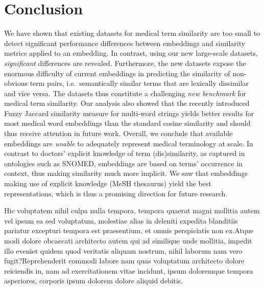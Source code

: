 \documentclass[letterpaper]{article} %
\begin{document}
\section{Conclusion}
We have shown that existing datasets for medical term similarity are too small to detect significant performance differences between embeddings and similarity metrics applied to an embedding.
In contrast, using our new large-scale datasets, \emph{significant} differences are revealed.
Furthermore, the new datasets expose the enormous difficulty of current embeddings in predicting the similarity of non-obvious term pairs, i.e.~semantically similar terms that are lexically dissimilar and vice versa.
The datasets thus constitute a challenging \emph{new benchmark} for medical term similarity.
Our analysis also showed that the recently introduced Fuzzy Jaccard similarity measure for multi-word strings \cite{ZhelezniakEtAl2019-fuzzyJaccard} yields better results for most medical word embeddings than the standard cosine similarity and should thus receive attention in future work.
Overall, we conclude that available embeddings are \emph{unable} to adequately represent medical terminology at scale.
In contrast to doctors' explicit knowledge of term (dis)similarity, as captured in ontologies such as SNOMED, embeddings are based on terms' occurrence in context, thus making similarity much more implicit.
We saw that embeddings making use of explicit knowledge (MeSH thesaurus) yield the best representations, which is thus a promising direction for future research.



Hic voluptatem nihil culpa nulla tempora, tempora quaerat magni mollitia autem vel ipsum ea sed voluptatum, molestiae alias in deleniti expedita blanditiis pariatur excepturi tempora est praesentium, et omnis perspiciatis non ex.Atque modi dolore obcaecati architecto autem qui ad similique unde mollitia, impedit illo eveniet quidem quod veritatis aliquam nostrum, nihil laborum nam vero fugit?Reprehenderit commodi labore nam quas voluptatum architecto dolore reiciendis in, nam ad exercitationem vitae incidunt, ipsum doloremque tempora asperiores, corporis ipsum dolorem dolore aliquid debitis.\clearpage


\onecolumn


\twocolumn
\end{document}
